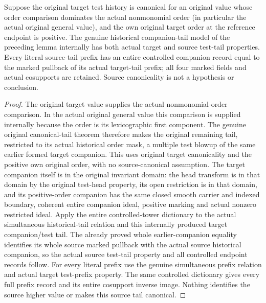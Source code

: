 \begin{theorem}
\label{hir:historical-control-controlled-tail}
\leanok
Suppose the original target test history is canonical for an original value whose order comparison dominates the actual nonmonomial order (in particular the actual original general value), and the own original target order at the reference endpoint is positive. The genuine historical companion-tail model of the preceding lemma internally has both actual target and source test-tail properties. Every literal source-tail prefix has an entire controlled companion record equal to the marked pullback of its actual target-tail prefix; all four marked fields and actual cosupports are retained. Source canonicality is not a hypothesis or conclusion.
\end{theorem}
\begin{proof}
The original target value supplies the actual nonmonomial-order comparison. In the actual original general value this comparison is supplied internally because the order is its lexicographic first component. The genuine original canonical-tail theorem therefore makes the original remaining tail, restricted to its actual historical order mask, a multiple test blowup of the same earlier formed target companion. This uses original target canonicality and the positive own original order, with no source-canonical assumption. The target companion itself is in the original invariant domain: the head transform is in that domain by the original test-head property, its open restriction is in that domain, and its positive-order companion has the same closed smooth carrier and indexed boundary, coherent entire companion ideal, positive marking and actual nonzero restricted ideal. Apply the entire controlled-tower dictionary to the actual simultaneous historical-tail relation and this internally produced target companion/test tail. The already proved whole earlier-companion equality identifies its whole source marked pullback with the actual source historical companion, so the actual source test-tail property and all controlled endpoint records follow. For every literal prefix use the genuine simultaneous prefix relation and actual target test-prefix property. The same controlled dictionary gives every full prefix record and its entire cosupport inverse image. Nothing identifies the source higher value or makes this source tail canonical.
\end{proof}

